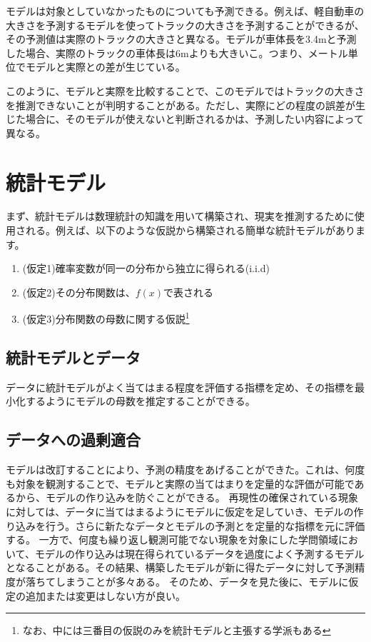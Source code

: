 モデルは対象としていなかったものについても予測できる。例えば、軽自動車の大きさを予測するモデルを使ってトラックの大きさを予測することができるが、その予測値は実際のトラックの大きさと異なる。モデルが車体長を3.4mと予測した場合、実際のトラックの車体長は6mよりも大きいこ。つまり、メートル単位でモデルと実際との差が生じている。

このように、モデルと実際を比較することで、このモデルではトラックの大きさを推測できないことが判明することがある。ただし、実際にどの程度の誤差が生じた場合に、そのモデルが使えないと判断されるかは、予測したい内容によって異なる。


\section{統計モデル}
まず、統計モデルは数理統計の知識を用いて構築され、現実を推測するために使用される。例えば、以下のような仮説から構築される簡単な統計モデルがあります。

\begin{enumerate}
    \item (仮定1)確率変数が同一の分布から独立に得られる(i.i.d)
    \item (仮定2)その分布関数は、$f(x)$で表される
    \item (仮定3)分布関数の母数に関する仮説\footnote{なお、中には三番目の仮説のみを統計モデルと主張する学派もある\cite{塩見_正衛2021}}
\end{enumerate}

\subsection{統計モデルとデータ}
データに統計モデルがよく当てはまる程度を評価する指標を定め、その指標を最小化するようにモデルの母数を推定することができる。



\subsection{データへの過剰適合}
モデルは改訂することにより、予測の精度をあげることができた。これは、何度も対象を観測することで、モデルと実際の当てはまりを定量的な評価が可能であるから、モデルの作り込みを防ぐことができる。
再現性の確保されている現象に対しては、データに当てはまるようにモデルに仮定を足していき、モデルの作り込みを行う。さらに新たなデータとモデルの予測とを定量的な指標を元に評価する。
一方で、何度も繰り返し観測可能でない現象を対象にした学問領域において、モデルの作り込みは現在得られているデータを過度によく予測するモデルとなることがある。その結果、構築したモデルが新に得たデータに対して予測精度が落ちてしまうことが多々ある。
そのため、データを見た後に、モデルに仮定の追加または変更はしない方が良い。




